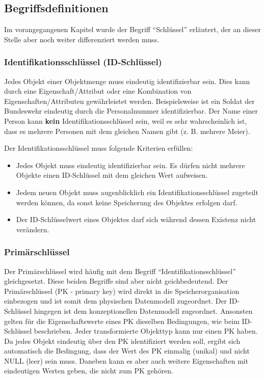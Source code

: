 \subsection{Begriffsdefinitionen}
\label{basics_definitions}
Im vorangegangenen Kapitel wurde der Begriff \enquote{Schlüssel} erläutert, der an dieser Stelle aber noch weiter differenziert werden muss.
\subsubsection{Identifikationsschlüssel (ID-Schlüssel)}
Jedes Objekt einer Objektmenge muss eindeutig identifizierbar sein. Dies kann durch eine Eigenschaft/Attribut oder eine Kombination von Eigenschaften/Attributen gewährleistet werden. Beispielsweise ist ein Soldat der Bundeswehr eindeutig durch die Personalnummer identifizierbar. Der Name einer Person kann \textbf{kein} Identifikationsschlüssel sein, weil es sehr wahrscheinlich ist, dass es mehrere Personen mit dem gleichen Namen gibt (z. B. mehrere Meier).

Der Identifikationsschlüssel muss folgende Kriterien erfüllen:
\begin{itemize}
    \item Jedes Objekt muss eindeutig identifizierbar sein. Es dürfen nicht mehrere Objekte einen ID-Schlüssel mit dem gleichen Wert aufweisen.
    \item Jedem neuen Objekt muss augenblicklich ein Identifikationsschlüssel zugeteilt werden können, da sonst keine Speicherung des Objektes erfolgen darf.
    \item Der ID-Schlüsselwert eines Objektes darf sich während dessen Existenz nicht verän\-dern.
\end{itemize}
\subsubsection{Primärschlüssel}
Der Primärschlüssel wird häufig mit dem Begriff \enquote{Identifikationsschlüssel} gleichgesetzt. Diese beiden Begriffe sind aber nicht geichbedeutend. Der Primärschlüssel (PK - primary key) wird direkt in die Speicherorganisation einbezogen und ist somit dem physischen Datenmodell zugeordnet. Der ID-Schlüssel hingegen ist dem konzeptionellen Datenmodell zugeordnet. Ansonsten gelten für die Eigenschaftswerte eines PK dieselben Bedingungen, wie beim ID-Schlüssel beschrieben. Jeder transformierte Objekttyp kann nur einen PK haben. Da jedes Objekt eindeutig über den PK identifiziert werden soll, ergibt sich automatisch die Bedingung, dass der Wert des PK einmalig (unikal) und nicht NULL (leer) sein muss. Daneben kann es aber auch weitere Eigenschaften mit eindeutigen Werten geben, die nicht zum PK gehören.
\clearpage
